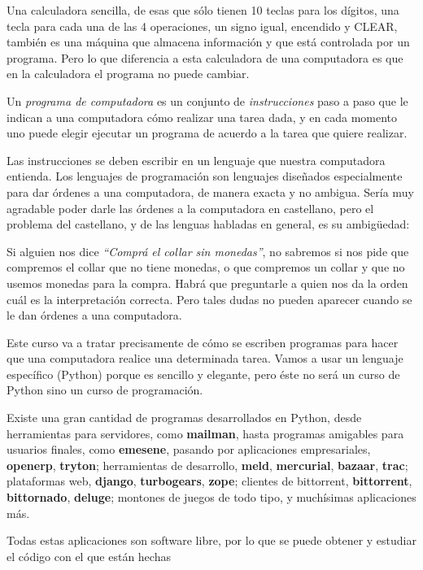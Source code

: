 Una calculadora sencilla, de esas que sólo tienen 10 teclas para
los dígitos, una tecla para cada una de las 4 operaciones, un
signo igual, encendido y CLEAR, también es una máquina que
almacena información y que está controlada por un programa. Pero
lo que diferencia a esta calculadora de una computadora es que en
la calculadora el programa no puede cambiar.

Un {\it programa de computadora} es un conjunto de {\it
instrucciones} paso a paso que le indican a una computadora cómo
realizar una tarea dada, y en cada momento uno puede elegir
ejecutar un programa de acuerdo a la tarea que quiere realizar.

Las instrucciones se deben escribir en un lenguaje que nuestra
computadora entienda. Los lenguajes de programación son
lenguajes diseñados especialmente para dar
órdenes a una computadora, de manera exacta y no ambigua. Sería
muy agradable poder darle las órdenes a la computadora en
castellano, pero el problema del castellano, y de las lenguas
habladas en general, es su ambigüedad:

Si alguien nos dice {\it ``Comprá el collar sin monedas''}, no sabremos
si nos pide que compremos el collar que no tiene monedas, o que compremos
un collar y que no usemos monedas para la compra. Habrá que preguntarle
a quien nos da la orden cuál es la interpretación correcta. Pero tales
dudas no pueden aparecer cuando se le dan órdenes a una computadora.

Este curso va a tratar precisamente de cómo se escriben programas
para hacer que una computadora realice una determinada tarea.
Vamos a usar un lenguaje específico (Python) porque es sencillo y
elegante, pero éste no será un curso de Python sino un curso de
programación.

\begin{sabias_que}
Existe una gran cantidad de programas desarrollados en Python, desde
herramientas para servidores, como {\bf mailman}, hasta programas amigables
para usuarios finales, como {\bf emesene}, pasando por aplicaciones
empresariales, {\bf openerp}, {\bf tryton}; herramientas de desarrollo,
{\bf meld}, {\bf mercurial}, {\bf bazaar}, {\bf trac}; plataformas web,
{\bf django}, {\bf turbogears}, {\bf zope}; clientes de bittorrent, {\bf
bittorrent}, {\bf bittornado}, {\bf deluge}; montones de juegos de todo
tipo, y muchísimas aplicaciones más.

Todas estas aplicaciones son software libre, por lo que se puede obtener y
estudiar el código con el que están hechas
\end{sabias_que}


